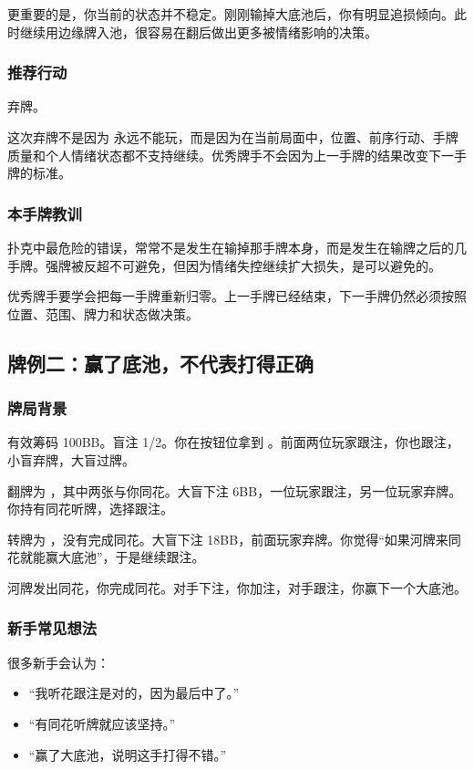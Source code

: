 更重要的是，你当前的状态并不稳定。刚刚输掉大底池后，你有明显追损倾向。此时继续用边缘牌入池，很容易在翻后做出更多被情绪影响的决策。

\subsubsection*{推荐行动}

弃牌。

这次弃牌不是因为  永远不能玩，而是因为在当前局面中，位置、前序行动、手牌质量和个人情绪状态都不支持继续。优秀牌手不会因为上一手牌的结果改变下一手牌的标准。

\subsubsection*{本手牌教训}

扑克中最危险的错误，常常不是发生在输掉那手牌本身，而是发生在输牌之后的几手牌。强牌被反超不可避免，但因为情绪失控继续扩大损失，是可以避免的。

优秀牌手要学会把每一手牌重新归零。上一手牌已经结束，下一手牌仍然必须按照位置、范围、牌力和状态做决策。

\subsection{牌例二：赢了底池，不代表打得正确}

\subsubsection*{牌局背景}

有效筹码 100BB。盲注 1/2。你在按钮位拿到 。前面两位玩家跟注，你也跟注，小盲弃牌，大盲过牌。

翻牌为 ，其中两张与你同花。大盲下注 6BB，一位玩家跟注，另一位玩家弃牌。你持有同花听牌，选择跟注。

转牌为 ，没有完成同花。大盲下注 18BB，前面玩家弃牌。你觉得“如果河牌来同花就能赢大底池”，于是继续跟注。

河牌发出同花，你完成同花。对手下注，你加注，对手跟注，你赢下一个大底池。

\subsubsection*{新手常见想法}

很多新手会认为：

\begin{itemize}
\item “我听花跟注是对的，因为最后中了。”
\item “有同花听牌就应该坚持。”
\item “赢了大底池，说明这手打得不错。”
\end{itemize}


